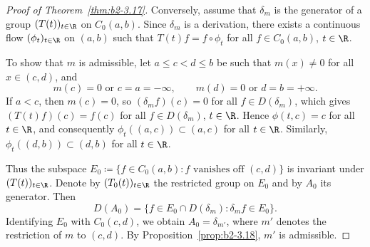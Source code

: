 \begin{proof}[Proof of Theorem~\ref{thm:b2-3.17}]
Conversely, assume that $\delta_{m}$ is the generator of a group $(T(t))_{t \in \R}$
on $C_{0}(a,b)$.
Since $\delta_{m}$ is a derivation, there exists a continuous flow $(\phi_{t})_{t \in \R}$
on $(a,b)$ such that $T(t)f = f \circ \phi_{t}$ for all $f \in C_{0}(a,b)$, $t \in \R$.

To show that $m$ is admissible, let $a \leq c < d \leq b$ be such that $m(x) \neq 0$
for all $x \in (c,d)$, and
\[
    m(c) = 0 \text{ or } c = a = -\infty,
    \qquad
    m(d) = 0 \text{ or } d = b = +\infty.
\]
If\/ $a < c$, then $m(c) = 0$, so $(\delta_{m}f)(c) = 0$ for all $f \in D(\delta_{m})$,
which gives $(T(t)f)(c) = f(c)$ for all $f \in D(\delta_{m})$, $t \in \R$.
Hence $\phi(t,c) = c$ for all $t \in \R$, and consequently
$\phi_{t}((a,c)) \subset (a,c)$ for all $t \in \R$.
Similarly, $\phi_{t}((d,b)) \subset (d,b)$ for all $t \in \R$.

Thus the subspace $E_{0} \coloneqq \{f \in C_{0}(a,b) : f \text{ vanishes off } (c,d)\}$
is invariant under $(T(t))_{t \in \R}$.
Denote by $(T_{0}(t))_{t \in \R}$ the restricted group on $E_{0}$ and by $A_{0}$ its generator.
Then
\[
    D(A_{0}) = \{f \in E_{0} \cap D(\delta_{m}) : \delta_{m}f \in E_{0}\}.
\]
Identifying $E_{0}$ with $C_{0}(c,d)$, we obtain $A_{0} = \delta_{m'}$, where $m'$
denotes the restriction of\/ $m$ to $(c,d)$.
By Proposition~\ref{prop:b2-3.18}, $m'$ is admissible.
\end{proof}
